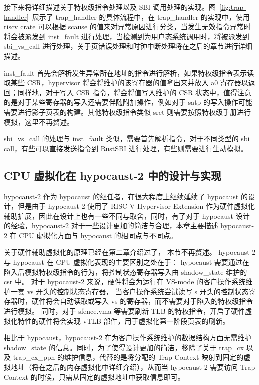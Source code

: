 接下来将详细描述关于特权级指令处理以及 SBI 调用处理的实现。图~\ref{fig:trap-handler}~展示了 trap\_handler 的具体流程中，在 trap\_handler 的实现中，使用 riscv crate 可以根据 scause 的值来对异常原因进行分类，当发生无效指令异常时将会被派发到 inst\_fault 进行处理，当检测到为用户态系统调用时，将被派发到 sbi\_vs\_call 进行处理，关于页错误处理和时钟中断处理将在之后的章节进行详细描述。  
  
inst\_fault 首先会解析发生异常所在地址的指令进行解析，如果特权级指令表示读取某些 CSR，hypervisor 将会将维护的该寄存器的值拿出来并放入 a0 寄存器以返回；同样地，对于写入 CSR 指令，将会将值写入维护的 CSR 状态中，值得注意的是对于某些寄存器的写入还需要伴随附加操作，例如对于 satp 的写入操作可能需要进行影子页表的构建。其他特权级指令类似 sret 则需要按照特权级手册进行模拟，这里不再赘述。 

sbi\_vs\_call 的处理与 inst\_fault 类似，需要首先解析指令，对于不同类型的 sbi call，有些可以直接发送指令到 RustSBI 进行处理，有些则需要进行生动模拟。

\subsection{CPU 虚拟化在 hypocaust-2 中的设计与实现}

hypocaust-2 作为 hypocaust 的继任者，在很大程度上继续延续了 hypocaust 的设计，但是由于 hypocaust-2 使用了 RISC-V Hypervisor Extension 作为硬件虚拟化辅助扩展，因此在设计上也有一些不同与取舍，同时，有了对于 hypocaust 设计的经验，hypocaust-2 对于一些设计更加的简洁与合理，本章主要描述 hypocaust-2 在 CPU 虚拟化方面与 hypocaust 的相同点与不同点。

关于硬件辅助虚拟化的原理已经在第二章介绍过了，
本节不再赘述。
hypocaust-2 与 hypocaust 在 CPU 虚拟化表现的主要区别之处在于：
hypocaust 需要通过在陷入后模拟特权级指令的行为，将控制状态寄存器写入由 shadow\_state 维护的 csr 中。
对于 hypocaust-2 来说，硬件将会为运行在 VS-mode 的客户操作系统维护一套 vs 开头的控制状态寄存器，
当客户操作系统尝试读写 s 开头的控制状态寄存器时，硬件将会自动读取或写入 vs 的寄存器，而不需要对于陷入的特权级指令进行模拟。
同时，对于 sfence.vma 等需要刷新 TLB 的特权指令，开启了硬件虚拟化特性的硬件将会实现 vTLB 部件，用于虚拟化第一阶段页表的刷新。

相比于 hypocaust，hypocaust-2 在为客户操作系统维护的数据结构方面无需维护 shadow\_state 的信息。同时，为了使得设计更加的简洁，移除了关于 trap\_cx 以及 trap\_cx\_ppn 的维护信息，代替的是将分配的 Trap Context 映射到固定的虚拟地址（将在之后的内存虚拟化中详细介绍），从而当 hypocaust-2 需要访问 Trap Context 的时候，只需从固定的虚拟地址中获取信息即可。


